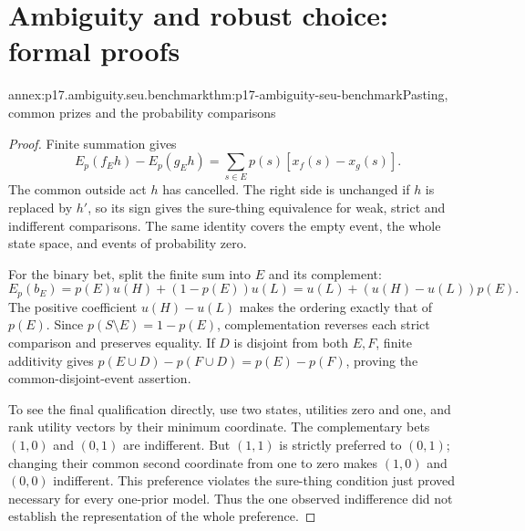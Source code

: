 \section{Ambiguity and robust choice: formal proofs}
\label{sec:annex-p17-ambiguity-and-robust-choice}

\begin{annexitem}{annex:p17.ambiguity.seu.benchmark}{thm:p17-ambiguity-seu-benchmark}{Pasting, common prizes and the probability comparisons}
\begin{proof}
Finite summation gives
\[
 E_p(f_Eh)-E_p(g_Eh)
                     =\sum_{s\in E}p(s)[x_f(s)-x_g(s)].
\]
The common outside act \(h\) has cancelled.
The right side is unchanged if \(h\) is replaced by \(h'\),
so its sign gives the sure-thing equivalence for weak,
strict and indifferent comparisons. The same identity
covers the empty event, the whole state space, and
events of probability zero.

For the binary bet, split the finite sum into \(E\)
and its complement:
\[
 E_p(b_E)=p(E)u(H)+(1-p(E))u(L)
                      =u(L)+(u(H)-u(L))p(E).
\]
The positive coefficient \(u(H)-u(L)\) makes the
ordering exactly that of \(p(E)\).
Since \(p(S\setminus E)=1-p(E)\), complementation
reverses each strict comparison and preserves equality.
If \(D\) is disjoint from both \(E,F\), finite additivity
gives \(p(E\cup D)-p(F\cup D)=p(E)-p(F)\),
proving the common-disjoint-event assertion.

To see the final qualification directly, use two states,
utilities zero and one, and rank utility vectors by their
minimum coordinate. The complementary bets \((1,0)\)
and \((0,1)\) are indifferent.
But \((1,1)\) is strictly preferred to \((0,1)\);
changing their common second coordinate from one to
zero makes \((1,0)\) and \((0,0)\) indifferent.
This preference violates the sure-thing condition
just proved necessary for every one-prior model.
Thus the one observed indifference did not establish
the representation of the whole preference.
\end{proof}
\end{annexitem}

